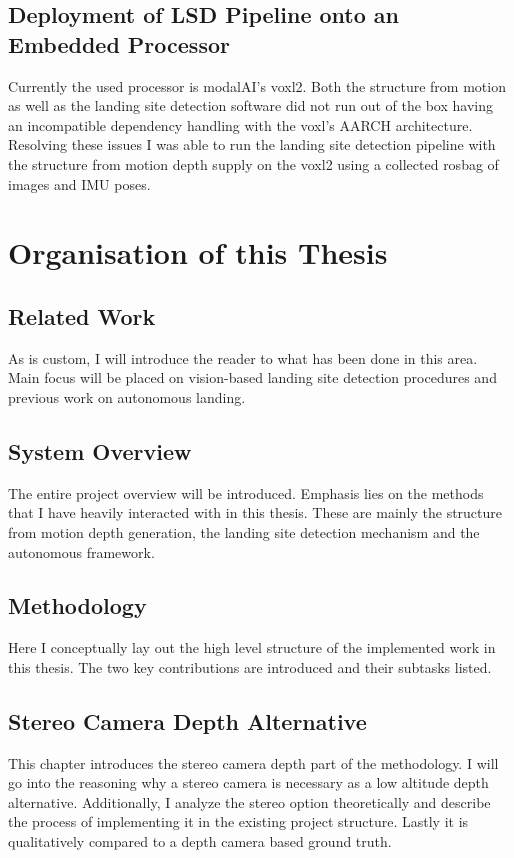 \subsection{Deployment of LSD Pipeline onto an Embedded Processor}
Currently the used processor is modalAI's voxl2. Both the structure from motion as well as the landing site detection software did not run out of the box having an incompatible dependency handling with the voxl's AARCH architecture. Resolving these issues I was able to run the landing site detection pipeline with the structure from motion depth supply on the voxl2 using a collected rosbag of images and IMU poses.

\section{Organisation of this Thesis}
\subsection{Related Work}
As is custom, I will introduce the reader to what has been done in this area. Main focus will be placed on vision-based landing site detection procedures and previous work on autonomous landing.
\subsection{System Overview}
The entire project overview will be introduced. Emphasis lies on the methods that I have heavily interacted with in this thesis. These are mainly the structure from motion depth generation, the landing site detection mechanism and the autonomous framework.
\subsection{Methodology}
Here I conceptually lay out the high level structure of the implemented work in this thesis. The two key contributions are introduced and their subtasks listed.
\subsection{Stereo Camera Depth Alternative}
This chapter introduces the stereo camera depth part of the methodology. I will go into the reasoning why a stereo camera is necessary as a low altitude depth alternative. Additionally, I analyze the stereo option theoretically and describe the process of implementing it in the existing project structure. Lastly it is qualitatively compared to a depth camera based ground truth.

